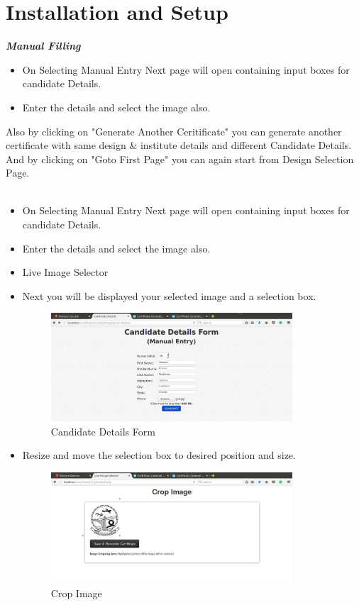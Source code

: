 \section{Installation and Setup}
\textbf{\emph{Manual Filling}}
\begin{itemize}
\item On Selecting Manual Entry Next page will open containing input boxes for candidate Details.
\item Enter the details and select the image also.
\end{itemize}
Also by clicking on "Generate Another Ceritificate" you can generate another certificate with same design \& institute details and different Candidate Details.
And by clicking on "Goto First Page" you can again start from Design Selection Page.\\\\
\begin{itemize}
\item On Selecting Manual Entry Next page will open containing input boxes for candidate Details.
\item Enter the details and select the image also.
\item Live Image Selector
\item Next you will be displayed your selected image and a selection box.

\begin{figure}[!ht]
\centering
\includegraphics[width=0.85\textwidth]{images/cgs/cgs4.png}                  
\caption{Candidate Details Form}
\hspace{-1.5em}
\end{figure}

\item Resize and move the selection box to desired position and size.

\begin{figure}[!ht]
\centering
\includegraphics[width=0.85\textwidth]{images/cgs/cgs5.png}                  
\caption{Crop Image}
\hspace{-1.5em}
\end{figure}
\end{itemize}
